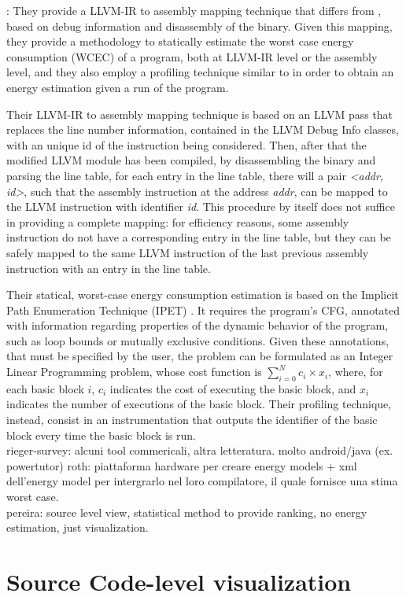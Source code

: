 \cite{eder}: They provide a LLVM-IR to assembly mapping technique that differs from \cite{brando2011}, based on debug information and disassembly of the binary. Given this mapping, they provide a methodology to statically estimate the worst case energy consumption (WCEC) of a program, both at LLVM-IR level or the assembly level, and they also employ a profiling technique similar to \cite{brando2011} in order to obtain an energy estimation given a run of the program. \par 
Their LLVM-IR to assembly mapping technique is based on an LLVM pass that replaces the line number information, contained in the LLVM Debug Info classes, with an unique id of the instruction being considered. Then, after that the modified LLVM module has been compiled, by disassembling the binary and parsing the line table, for each entry in the line table, there will a pair \emph{<addr, id>}, such that the assembly instruction at the address \emph{addr}, can be mapped to the LLVM instruction with identifier \emph{id}.
\newline This procedure by itself does not suffice in providing a complete mapping: for efficiency reasons, some assembly instruction do not have a corresponding entry in the line table, but they can be safely mapped to the same LLVM instruction of the last previous assembly instruction with an entry in the line table. \par 
Their statical, worst-case energy consumption estimation is based on the Implicit Path Enumeration Technique (IPET) \cite{ipet}. It requires the program's CFG, annotated with information regarding properties of the dynamic behavior of the program, such as loop bounds or mutually exclusive conditions.
Given these annotations, that must be specified by the user, the problem can be formulated as an Integer Linear Programming problem, whose cost function is $\sum_{i=0}^{N} c_{i} \times x_{i}$, where, for each basic block $i$, $c_{i}$ indicates the cost of executing the basic block, and $x_{i}$ indicates the number of executions of the basic block. 
Their profiling technique, instead, consist in an instrumentation that outputs the identifier of the basic block every time the basic block is run. \\[1in]


rieger-survey: alcuni tool commericali, altra letteratura. molto android/java (ex. powertutor)
roth: piattaforma hardware per creare energy models + xml dell'energy model per intergrarlo nel loro compilatore, il quale fornisce una stima worst case. \\
pereira: source level view, statistical method to provide ranking, no energy estimation, just visualization. \\

\section{Source Code-level visualization}
